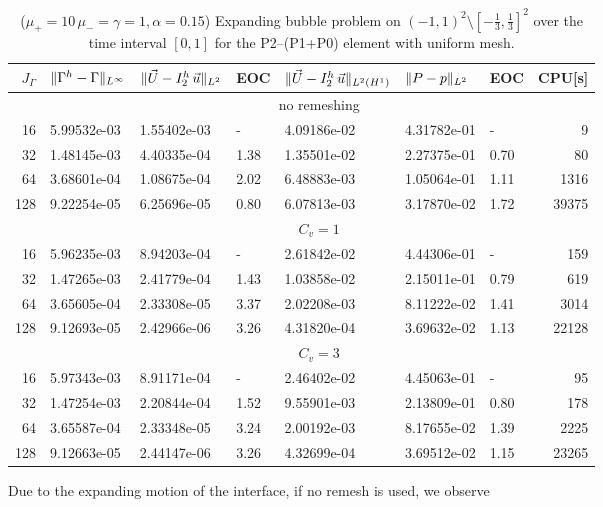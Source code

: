 \begin{table}
\center
\hspace*{-3.25cm}
\begin{tabular}{rllllllr}
\hline
$J_\Gamma$ & $\|\Gamma^h - \Gamma\|_{L^\infty}$ & $\|\vec U - I^h_{2}\,\vec u\|_{L^2}$ & EOC & $\|\vec U - I^h_{2}\,\vec u\|_{L^2(H^1)}$ & $\|P - p\|_{L^2}$ & EOC
& CPU[s] \\
\hline
& \multicolumn{7}{c}{no remeshing} \\
\hline
 16 & 5.99532e-03 & 1.55402e-03 &    - & 4.09186e-02 & 4.31782e-01 &    - &
9 \\
 32 & 1.48145e-03 & 4.40335e-04 & 1.38 & 1.35501e-02 & 2.27375e-01 & 0.70 &
80 \\
 64 & 3.68601e-04 & 1.08675e-04 & 2.02 & 6.48883e-03 & 1.05064e-01 & 1.11 &
1316 \\
128 & 9.22254e-05 & 6.25696e-05 & 0.80 & 6.07813e-03 & 3.17870e-02 & 1.72 &
39375 \\
\hline
& \multicolumn{7}{c}{$C_v=1$} \\
\hline
 16 & 5.96235e-03 & 8.94203e-04 &    - & 2.61842e-02 & 4.44306e-01 &    - &
159 \\
 32 & 1.47265e-03 & 2.41779e-04 & 1.43 & 1.03858e-02 & 2.15011e-01 & 0.79 &
619 \\
 64 & 3.65605e-04 & 2.33308e-05 & 3.37 & 2.02208e-03 & 8.11222e-02 & 1.41 &
3014 \\
128 & 9.12693e-05 & 2.42966e-06 & 3.26 & 4.31820e-04 & 3.69632e-02 & 1.13 &
22128 \\
\hline
& \multicolumn{7}{c}{$C_v=3$} \\
\hline
 16 & 5.97343e-03 & 8.91171e-04 &    - & 2.46402e-02 & 4.45063e-01 &    - &
95 \\
 32 & 1.47254e-03 & 2.20844e-04 & 1.52 & 9.55901e-03 & 2.13809e-01 & 0.80 &
178 \\
 64 & 3.65587e-04 & 2.33348e-05 & 3.24 & 2.00192e-03 & 8.17655e-02 & 1.39 &
2225 \\
128 & 9.12663e-05 & 2.44147e-06 & 3.26 & 4.32699e-04 & 3.69512e-02 & 1.15 &
23265 \\
\hline
\end{tabular}
\hspace*{-3.25cm}
\caption[Stokes expanding bubble uniform mesh errors P2--(P1+P0)]
{($\mu_+ = 10\,\mu_- = \gamma = 1,\alpha = 0.15$) Expanding bubble
problem on $(-1,1)^2\setminus[-\frac{1}{3},\frac{1}{3}]^2$ over the time
interval $[0,1]$ for the P2--(P1+P0) element with uniform mesh.}
\label{tab:expandingbubble2Dp2p1p0}
\end{table}
Due to the expanding motion of the interface, if no remesh is used, we observe
